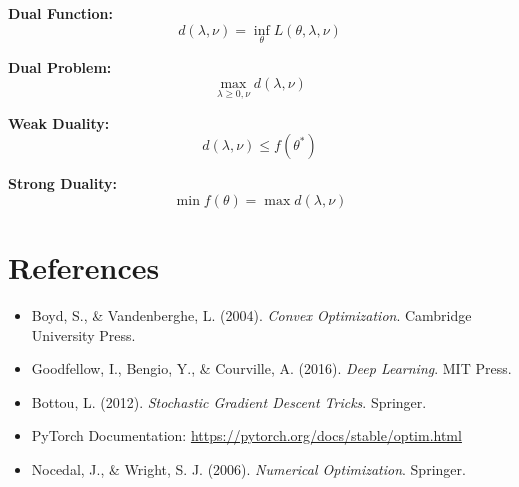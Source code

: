 \documentclass[12pt]{article}
\begin{document}
\textbf{Dual Function:}
\[
d(\lambda, \nu) = \inf_\theta L(\theta, \lambda, \nu)
\]

\textbf{Dual Problem:}
\[
\max_{\lambda \geq 0, \nu} d(\lambda, \nu)
\]

\textbf{Weak Duality:}
\[
d(\lambda, \nu) \leq f(\theta^*)
\]

\textbf{Strong Duality:}
\[
\min f(\theta) = \max d(\lambda, \nu)
\]

\section{References}

\begin{itemize}
    \item Boyd, S., \& Vandenberghe, L. (2004). \textit{Convex Optimization}. Cambridge University Press.
    \item Goodfellow, I., Bengio, Y., \& Courville, A. (2016). \textit{Deep Learning}. MIT Press.
    \item Bottou, L. (2012). \textit{Stochastic Gradient Descent Tricks}. Springer.
    \item PyTorch Documentation: \url{https://pytorch.org/docs/stable/optim.html}
    \item Nocedal, J., \& Wright, S. J. (2006). \textit{Numerical Optimization}. Springer.
\end{itemize}
\end{document}

